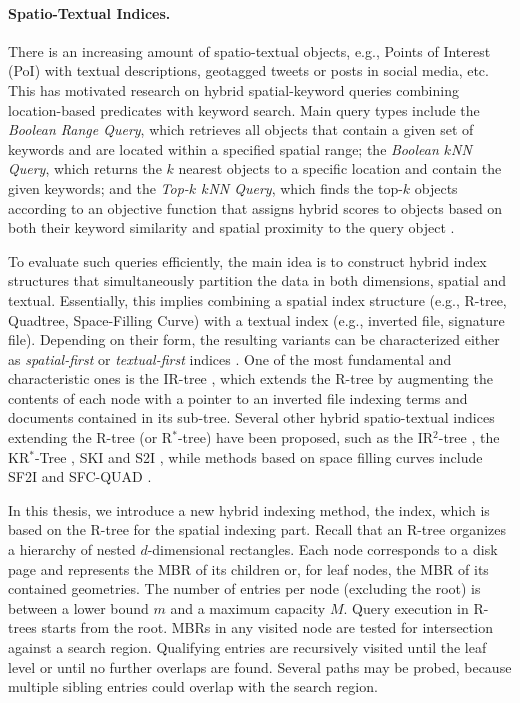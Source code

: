 \paragraph{Spatio-Textual Indices.} There is an increasing amount of spatio-textual objects, e.g., Points of Interest (PoI) with textual descriptions, geotagged tweets or posts in social media, etc. This has motivated research on hybrid spatial-keyword queries combining location-based predicates with keyword search. Main query types include the \emph{Boolean Range Query}, which retrieves all objects that contain a given set of keywords and are located within a specified spatial range; the \emph{Boolean $k$NN Query}, which returns the $k$ nearest objects to a specific location and contain the given keywords; and the \emph{Top-$k$ $k$NN Query}, which finds the top-$k$ objects according to an objective function that assigns hybrid scores to objects based on both their keyword similarity and spatial proximity to the query object \cite{chen2013pvldb}.

To evaluate such queries efficiently, the main idea is to construct hybrid index structures that simultaneously partition the data in both dimensions, spatial and textual. Essentially, this implies combining a spatial index structure (e.g., R-tree, Quadtree, Space-Filling Curve) with a textual index (e.g., inverted file, signature file). Depending on their form, the resulting variants can be characterized either as {\em spatial-first} or {\em textual-first} indices \cite{christoforaki2011cikm}. One of the most fundamental and characteristic ones is the IR-tree \cite{cong2009vldb,zhisheng2011tkde}, which extends the R-tree by augmenting the contents of each node with a pointer to an inverted file indexing terms and documents contained in its sub-tree. Several other hybrid spatio-textual indices extending the R-tree (or R$^*$-tree) have been proposed, such as the IR$^2$-tree \cite{defelipe2008icde}, the KR$^*$-Tree \cite{hariharan2007ssdbm}, SKI \cite{cary2010ssdbm} and S2I \cite{rocha2011ssd}, while methods based on space filling curves include SF2I \cite{chen2006sigmod} and SFC-QUAD \cite{christoforaki2011cikm}.

In this thesis, we introduce a new hybrid indexing method, the \btsr index, which is based on the R-tree \cite{Guttman1984} for the spatial indexing part. Recall that an R-tree organizes a hierarchy of nested $d$-dimensional rectangles. Each node corresponds to a disk page and represents the MBR of its children or, for leaf nodes, the MBR of its contained geometries. The number of entries per node (excluding the root) is between a lower bound $m$ and a maximum capacity $M$. Query execution in R-trees starts from the root. MBRs in any visited node are tested for intersection against a search region. Qualifying entries are recursively visited until the leaf level or until no further overlaps are found. Several paths may be probed, because multiple sibling entries could overlap with the search region.

